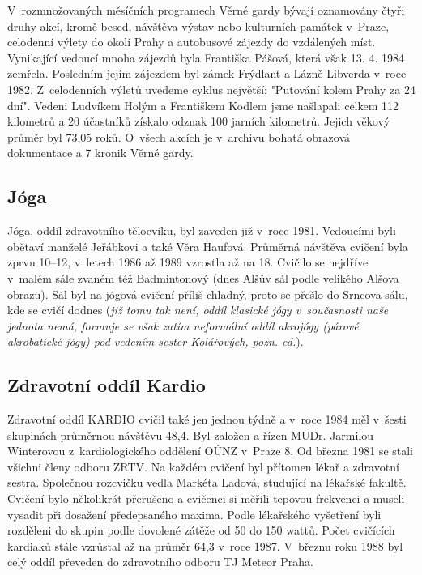 \documentclass[a5paper, 11pt, twoside]{article}
\begin{document}
V~rozmnožovaných měsíčních programech Věrné gardy bývají oznamovány
čtyři druhy akcí, kromě besed, návštěva výstav nebo kulturních památek
v~Praze, celodenní výlety do okolí Prahy a autobusové zájezdy do
vzdálených míst. Vynikající vedoucí mnoha zájezdů byla Františka Pášová,
která však 13. 4. 1984 zemřela. Posledním jejím zájezdem byl zámek
Frýdlant a Lázně Libverda v~roce 1982. Z~celodenních výletů uvedeme
cyklus největší: "Putování kolem Prahy za 24 dní". Vedeni Ludvíkem
Holým a Františkem Kodlem jsme našlapali celkem 112 kilometrů a 20
účastníků získalo odznak 100 jarních kilometrů. Jejich věkový průměr byl
73,05 roků. O~všech akcích je v~archivu bohatá obrazová dokumentace a 7
kronik Věrné gardy.

\subsection{Jóga}

Jóga, oddíl zdravotního tělocviku, byl zaveden již v~roce 1981.
Vedoucími byli obětaví manželé Jeřábkovi a také Věra Haufová. Průměrná
návštěva cvičení byla zprvu 10--12, v~letech 1986 až 1989 vzrostla až na
18. Cvičilo se nejdříve v~malém sále zvaném též Badmintonový (dnes Alšův
sál podle velikého Alšova obrazu). Sál byl na jógová cvičení příliš
chladný, proto se přešlo do Srncova sálu, kde se cvičí dodnes (\textit{již
tomu tak není, oddíl klasické jógy v~současnosti naše jednota nemá,
formuje se však zatím neformální oddíl akrojógy (párové akrobatické
jógy) pod vedením sester Kolářových, pozn. ed.}).

\subsection{Zdravotní oddíl Kardio}

Zdravotní oddíl KARDIO cvičil také jen jednou týdně a v~roce 1984 měl
v~šesti skupinách průměrnou návštěvu 48,4. Byl založen a řízen MUDr.
Jarmilou Winterovou z~kardiologického oddělení OÚNZ v~Praze 8. Od března
1981 se stali všichni členy odboru ZRTV. Na každém cvičení byl přítomen
lékař a zdravotní sestra. Společnou rozcvičku vedla Markéta Ladová,
studující na lékařské fakultě. Cvičení bylo několikrát přerušeno a
cvičenci si měřili tepovou frekvenci a museli vysadit při dosažení
předepsaného maxima. Podle lékařského vyšetření byli rozděleni do skupin
podle dovolené zátěže od 50 do 150 wattů. Počet cvičících kardiaků stále
vzrůstal až na průměr 64,3 v~roce 1987. V~březnu roku 1988 byl celý
oddíl převeden do zdravotního odboru TJ Meteor Praha.
\end{document}
